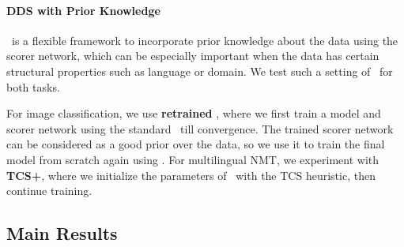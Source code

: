 \paragraph{DDS with Prior Knowledge} \dds~is a flexible framework to incorporate prior knowledge about the data using the scorer network, which can be especially important when the data has certain structural properties such as language or domain. We test such a setting of \dds~for both tasks.

For image classification, we use \textbf{retrained \dds}, where we first train a model and scorer network using the standard \dds~till convergence. The trained scorer network can be considered as a good prior over the data, so we use it to train the final model from scratch again using \dds. For multilingual NMT, we experiment with \textbf{TCS+\dds}, where we initialize the parameters of \dds~with the TCS heuristic, then continue training. 





\subsection{Main Results}


